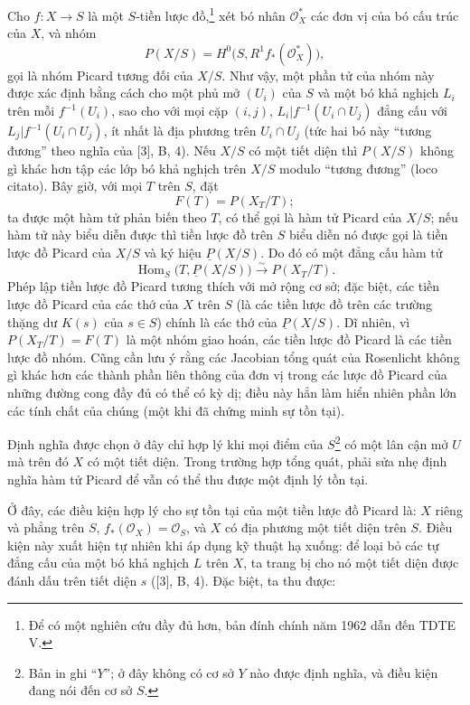 Cho $f:X\longrightarrow S$ là một $S$-tiền lược đồ,\footnote{Để có một nghiên
cứu đầy đủ hơn, bản đính chính năm 1962 dẫn đến TDTE V.} xét bó nhân
$\mathcal O_X^*$ các đơn vị của bó cấu trúc của $X$, và nhóm
\[
  P(X/S)=H^0\bigl(S,R^1f_*(\mathcal O_X^*)\bigr),
\]
gọi là nhóm Picard tương đối của $X/S$. Như vậy, một phần tử của nhóm này được
xác định bằng cách cho một phủ mở $(U_i)$ của $S$ và một bó khả nghịch $L_i$
trên mỗi $f^{-1}(U_i)$, sao cho với mọi cặp $(i,j)$,
$L_i|f^{-1}(U_i\cap U_j)$ đẳng cấu với
$L_j|f^{-1}(U_i\cap U_j)$, ít nhất là địa phương trên $U_i\cap U_j$ (tức hai bó
này ``tương đương'' theo nghĩa của [3], B, 4). Nếu $X/S$ có một tiết diện thì
$P(X/S)$ không gì khác hơn tập các lớp bó khả nghịch trên $X/S$ modulo
``tương đương'' (loco citato). Bây giờ, với mọi $T$ trên $S$, đặt
\[
  F(T)=P(X_T/T) ;
\]
ta được một hàm tử phản biến theo $T$, có thể gọi là hàm tử Picard của $X/S$;
nếu hàm tử này biểu diễn được thì tiền lược đồ trên $S$ biểu diễn nó được gọi
là tiền lược đồ Picard của $X/S$ và ký hiệu $\underline P(X/S)$. Do đó có một
đẳng cấu hàm tử
\[
  \operatorname{Hom}_S\bigl(T,\underline P(X/S)\bigr)
  \xrightarrow{\sim}P(X_T/T).
\]
Phép lập tiền lược đồ Picard tương thích với mở rộng cơ sở; đặc biệt, các tiền
lược đồ Picard của các thớ của $X$ trên $S$ (là các tiền lược đồ trên các
trường thặng dư $K(s)$ của $s\in S$) chính là các thớ của
$\underline P(X/S)$. Dĩ nhiên, vì $P(X_T/T)=F(T)$ là một nhóm giao hoán, các
tiền lược đồ Picard là các tiền lược đồ nhóm. Cũng cần lưu ý rằng các Jacobian
tổng quát của Rosenlicht không gì khác hơn các thành phần liên thông của đơn
vị trong các lược đồ Picard của những đường cong đầy đủ có thể có kỳ dị; điều
này hẳn làm hiển nhiên phần lớn các tính chất của chúng (một khi đã chứng minh
sự tồn tại).

 Định nghĩa được chọn ở đây chỉ hợp lý khi mọi điểm của
$S$\footnote{Bản in ghi ``$Y$''; ở đây không có cơ sở $Y$ nào được định nghĩa,
và điều kiện đang nói đến cơ sở $S$.} có một lân cận mở $U$ mà trên đó $X$ có
một tiết diện. Trong trường hợp tổng quát, phải sửa nhẹ định nghĩa hàm tử
Picard để vẫn có thể thu được một định lý tồn tại.

Ở đây, các điều kiện hợp lý cho sự tồn tại của một tiền lược đồ Picard là:
$X$ riêng và phẳng trên $S$, $f_*(\mathcal O_X)=\mathcal O_S$, và $X$ có địa
phương một tiết diện trên $S$. Điều kiện này xuất hiện tự nhiên khi áp dụng kỹ
thuật hạ xuống: để loại bỏ các tự đẳng cấu của một bó khả nghịch $L$ trên $X$,
ta trang bị cho nó một tiết diện được đánh dấu trên tiết diện $s$ ([3], B, 4).
Đặc biệt, ta thu được:

